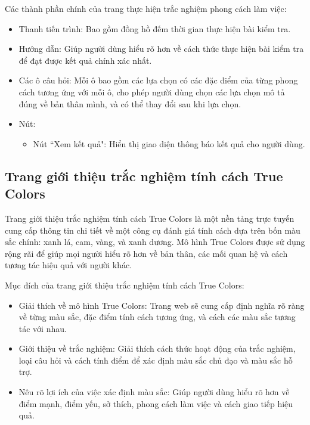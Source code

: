Các thành phần chính của trang thực hiện trắc nghiệm phong cách làm việc:
\begin{itemize}
    \item Thanh tiến trình: Bao gồm đồng hồ đếm thời gian thực hiện bài kiểm tra.
    \item Hướng dẫn: Giúp người dùng hiểu rõ hơn về cách thức thực hiện bài kiểm tra để đạt được kết quả chính xác nhất.
    \item Các ô câu hỏi: Mỗi ô bao gồm các lựa chọn có các đặc điểm của từng phong cách tương ứng với mỗi ô, cho phép người dùng chọn các lựa chọn mô tả đúng về bản thân mình, và có thể thay đổi sau khi lựa chọn.
    \item Nút:
        \begin{itemize}
            \item Nút ``Xem kết quả": Hiển thị giao diện thông báo kết quả cho người dùng.
        \end{itemize}
\end{itemize}


\subsection{Trang giới thiệu trắc nghiệm tính cách True Colors}
Trang giới thiệu trắc nghiệm tính cách True Colors là một nền tảng trực tuyến cung cấp thông tin chi tiết về một công cụ đánh giá tính cách dựa trên bốn màu sắc chính: xanh lá, cam, vàng, và xanh dương. Mô hình True Colors được sử dụng rộng rãi để giúp mọi người hiểu rõ hơn về bản thân, các mối quan hệ và cách tương tác hiệu quả với người khác.

Mục đích của trang giới thiệu trắc nghiệm tính cách True Colors:
\begin{itemize}
    \item Giải thích về mô hình True Colors: Trang web sẽ cung cấp định nghĩa rõ ràng về từng màu sắc, đặc điểm tính cách tương ứng, và cách các màu sắc tương tác với nhau.
    \item Giới thiệu về trắc nghiệm: Giải thích cách thức hoạt động của trắc nghiệm, loại câu hỏi và cách tính điểm để xác định màu sắc chủ đạo và màu sắc hỗ trợ.
    \item Nêu rõ lợi ích của việc xác định màu sắc: Giúp người dùng hiểu rõ hơn về điểm mạnh, điểm yếu, sở thích, phong cách làm việc và cách giao tiếp hiệu quả.
\end{itemize}

